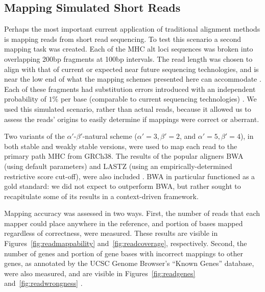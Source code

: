 \subsection{Mapping Simulated Short Reads}
\label{subsec:reads}

Perhaps the most important current application of traditional alignment methods is mapping reads from short read sequencing. To test this scenario a second mapping task was created. Each of the MHC alt loci sequences was broken into overlapping 200bp fragments at 100bp intervals. The read length was chosen to align with that of current or expected near future sequencing technologies, and is near the low end of what the mapping schemes presented here can accommodate \citep{quail2012tale}. Each of these fragments had substitution errors introduced with an independent probability of $1\%$ per base (comparable to current sequencing technologies) \citep{quail2012tale}. We used this simulated scenario, rather than actual reads, because it allowed us to assess the reads' origins to easily determine if mappings were correct or aberrant.


Two variants of the $\alpha'$-$\beta'$-natural scheme ($\alpha' = 3, \beta' = 2$, and $\alpha' = 5, \beta' = 4$), in both stable and weakly stable versions, were used to map each read to the primary path MHC from GRCh38. The results of the popular aligners BWA (using default parameters) and LASTZ (using an empirically-determined restrictive score cut-off), were also included \citep{li2010fast,harris2007improved}. BWA in particular functioned as a gold standard: we did not expect to outperform BWA, but rather sought to recapitulate some of its results in a context-driven framework.

Mapping accuracy was assessed in two ways. First, the number of reads that each mapper could place anywhere in the reference, and portion of bases mapped regardless of correctness, were measured. These results are visible in Figures~\ref{fig:readmappability} and~\ref{fig:readcoverage}, respectively. Second, the number of genes and portion of gene bases with incorrect mappings to other genes, as annotated by the UCSC Genome Browser's ``Known Genes'' database, were also measured, and are visible in Figures~\ref{fig:readgenes} and~\ref{fig:readwrongness} \citep{meyer2013ucsc}.  



